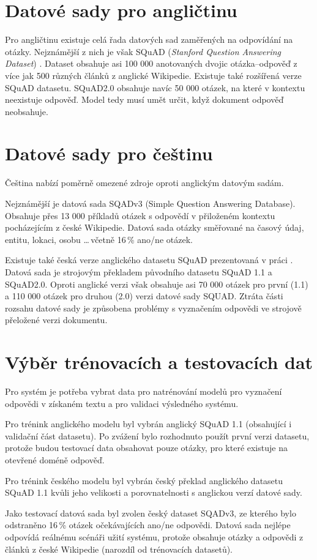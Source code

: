 \section{Datové sady pro angličtinu}
Pro angličtinu existuje celá řada datových sad zaměřených na odpovídání na otázky. Nejznámější z nich je však SQuAD (\emph{Stanford Question Answering Dataset}) \cite{squad}. Dataset obsahuje asi 100 000 anotovaných dvojic otázka--odpověď z více jak 500 různých článků z anglické Wikipedie. Existuje také rozšířená verze SQuAD datasetu. SQuAD2.0 \cite{squad_v2} obsahuje navíc 50 000 otázek, na které v kontextu neexistuje odpověď. Model tedy musí umět určit, když dokument odpověď neobsahuje.

\section{Datové sady pro češtinu}
Čeština nabízí poměrně omezené zdroje oproti anglickým datovým sadám.\par 
Nejznámější je datová sada SQADv3 (Simple Question Answering Database)\cite{sqad}. Obsahuje přes 13 000 příkladů otázek s odpovědí v přiloženém kontextu pocházejícím z české Wikipedie. Datová sada otázky směřované na časový údaj, entitu, lokaci, osobu \dots \,včetně 16\,\% ano/ne otázek.\par
Existuje také česká verze anglického datasetu SQuAD prezentovaná v práci \cite{czech_squad}. Datová sada je strojovým překladem původního datasetu SQuAD 1.1 a SQuAD2.0. Oproti anglické verzi však obsahuje asi 70 000 otázek pro první (1.1) a 110 000 otázek pro druhou (2.0) verzi datové sady SQUAD. Ztráta části rozsahu datové sady je způsobena problémy s vyznačením odpovědi ve strojově přeložené verzi dokumentu.

\section{Výběr trénovacích a testovacích dat}
Pro systém je potřeba vybrat data pro natrénování modelů pro vyznačení odpovědi v získaném textu a pro validaci výsledného systému.\par
Pro trénink anglického modelu byl vybrán anglický SQuAD 1.1 (obsahující i validační část datasetu). Po zvážení bylo rozhodnuto použít první verzi datasetu, protože budou testovací data obsahovat pouze otázky, pro které existuje na otevřené doméně odpověď.\par
Pro trénink českého modelu byl vybrán český překlad anglického datasetu SQuAD 1.1 \cite{czech_squad} kvůli jeho velikosti a porovnatelnosti s anglickou verzí datové sady.\par
\medskip
Jako testovací datová sada byl zvolen český dataset SQADv3, ze kterého bylo odstraněno 16\,\% otázek očekávajících ano/ne odpovědi. Datová sada nejlépe odpovídá reálnému scénáři užití systému, protože obsahuje otázky a odpovědi z článků z české Wikipedie (narozdíl od trénovacích datasetů).



